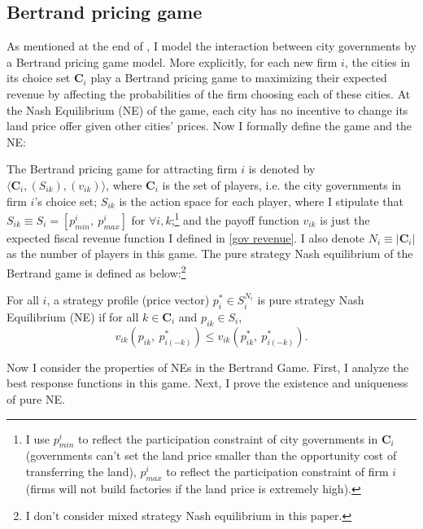 \subsection{Bertrand pricing game}
\label{subsec: Bertrand pricing game}
As mentioned at the end of , I model the interaction
between city governments by a Bertrand pricing game model.
More explicitly, for each
new firm $i$, the cities in its choice set $\mathbf{C}_i$ play a Bertrand pricing game to
maximizing their expected revenue by affecting the probabilities of
the firm choosing each of these cities.
At the Nash Equilibrium (NE) of the game, each city has no incentive to
change its land price offer given other cities' prices.
Now I formally define the game and the NE:

The Bertrand pricing game for attracting firm $i$ is denoted by
$\langle \mathbf{C}_{i}, (S_{ik}), (v_{ik}) \rangle$, where $\mathbf{C}_i$ is the set of players,
i.e. the city governments in firm $i$'s choice set;
$S_{ik}$ is the action space for each player,
where I stipulate that
$S_{ik} \equiv S_{i} =  [p^{i}_{min}, ~p^{i}_{max}]$ for $\forall i, k$;\footnote{
    I use $p^{i}_{min}$ to reflect the participation constraint of city governments
    in $\mathbf{C}_i$
    (governments can't set the land price smaller than the opportunity cost of
    transferring the land),
    $p^{i}_{max}$ to reflect the participation constraint of firm $i$
    (firms will not build factories if the land price is extremely high).}
and the payoff function $v_{ik}$ is just the expected fiscal revenue function I defined in
\eqref{gov revenue}.
I also denote $N_i \equiv |\mathbf{C}_i|$ as the number of players in this game.
The pure strategy Nash equilibrium of the Bertrand game is defined as below:\footnote{
    I don't consider mixed strategy Nash equilibrium in this paper.
}

\begin{defn}
    For all $i$, a strategy profile (price vector) $p^{*}_{i} \in S_{i}^{N_i}$
    is pure strategy
    Nash Equilibrium (NE) if for
    all $k \in \mathbf{C}_i$ and $p_{ik} \in S_i$,
    \useshortskip
    \begin{equation*}
        v_{ik}(p_{ik}, ~p^{*}_{i(-k)}) \leq v_{ik}(p^{*}_{ik}, ~p^{*}_{i(-k)}).
    \end{equation*}
\end{defn}

Now I consider the properties of NEs in the Bertrand Game. First, I analyze the best response
functions in this game. Next, I prove the existence and uniqueness of pure NE.

